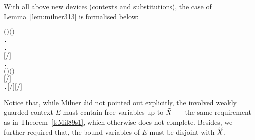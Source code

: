 With all above new devices (\multivariate contexts and substitutions),
the \multivariate case of Lemma~\ref{lem:milner313} is formalised
below:
\begin{alltt}
\HOLTokenTurnstile{}    \HOLSymConst{\HOLTokenConj{}}   \HOLSymConst{\HOLTokenSubset{}}   \HOLSymConst{\HOLTokenConj{}}  \ensuremath{(} \ensuremath{)} \ensuremath{(} \ensuremath{)} \HOLSymConst{\HOLTokenImp{}}
   \HOLSymConst{\HOLTokenForall{}}.
         \HOLSymConst{\ensuremath{=}}   \HOLSymConst{\HOLTokenImp{}}
       \HOLSymConst{\HOLTokenForall{}} .
           \ensuremath{[}\ensuremath{/}\ensuremath{]}  \HOLTokenTransBegin{}\HOLTokenTransEnd {} \HOLSymConst{\HOLTokenImp{}}
           \HOLSymConst{\HOLTokenExists{}}.
                  \HOLSymConst{\HOLTokenConj{}}   \HOLSymConst{\HOLTokenSubset{}}   \HOLSymConst{\HOLTokenConj{}}  \ensuremath{(} \ensuremath{)} \ensuremath{(} \ensuremath{)} \HOLSymConst{\HOLTokenConj{}}
                \HOLSymConst{\ensuremath{=}} \ensuremath{[}\ensuremath{/}\ensuremath{]}  \HOLSymConst{\HOLTokenConj{}}
               \HOLSymConst{\HOLTokenForall{}}.   \HOLSymConst{\ensuremath{=}}   \HOLSymConst{\HOLTokenImp{}} \ensuremath{[}\ensuremath{/}\ensuremath{]}  \HOLTokenTransBegin{}\HOLTokenTransEnd \ensuremath{[}\ensuremath{/}\ensuremath{]} 
\end{alltt}
Notice that, while Milner did not pointed out explicitly, the involved
weakly guarded context $E$ must contain free variables up to $\widetilde
X$~--- the same requirement as in Theorem~\ref{t:Mil89s1}, which
otherwise does not complete. Besides, we further required that, the
bound variables of $E$ must be disjoint with $\widetilde X$.

